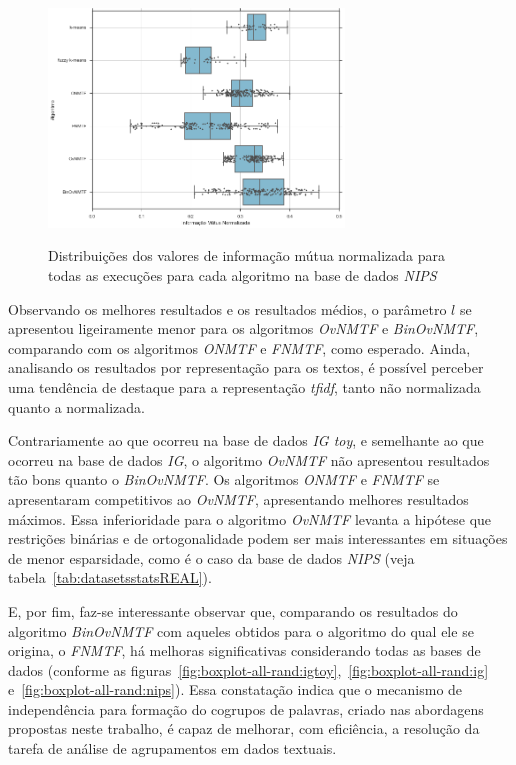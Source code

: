 \documentclass[
    12pt,                %
    oneside,            %
    a4paper,            %
    english,            %
    brazil                %
    ]{abntex2ppgsi}
\begin{document}
\begin{figure}[H]
    \centering
    \caption{Distribuições dos valores de informação mútua normalizada para todas as execuções para cada algoritmo na base de dados \textit{NIPS}}
    \includegraphics[width=0.7\textwidth]{img/boxplot-all-nmi-nips.png}
    \label{fig:boxplot-all-nmi:nips}
\end{figure}

Observando os melhores resultados e os resultados médios, o parâmetro $l$ se apresentou ligeiramente menor para os algoritmos \textit{OvNMTF} e \textit{BinOvNMTF}, comparando com os algoritmos \textit{ONMTF} e \textit{FNMTF}, como esperado. Ainda, analisando os resultados por representação para os textos, é possível perceber uma tendência de destaque para a representação \textit{tfidf}, tanto não normalizada quanto a normalizada.


Contrariamente ao que ocorreu na base de dados \textit{IG toy}, e semelhante ao que ocorreu na base de dados \textit{IG}, o algoritmo \textit{OvNMTF} não apresentou resultados tão bons quanto o \textit{BinOvNMTF}.
Os algoritmos \textit{ONMTF} e \textit{FNMTF} se apresentaram competitivos ao \textit{OvNMTF}, apresentando melhores resultados máximos.
Essa inferioridade para o algoritmo \textit{OvNMTF} levanta a hipótese que restrições binárias e de ortogonalidade podem ser mais interessantes em situações de menor esparsidade, como é o caso da base de dados \textit{NIPS} (veja tabela~\ref{tab:datasetsstatsREAL}).

E, por fim, faz-se interessante observar que, comparando os resultados do algoritmo \textit{BinOvNMTF} com aqueles obtidos para o algoritmo do qual ele se origina, o \textit{FNMTF}, há melhoras significativas considerando todas as bases de dados (conforme as figuras~\ref{fig:boxplot-all-rand:igtoy},~\ref{fig:boxplot-all-rand:ig} e~\ref{fig:boxplot-all-rand:nips}).
Essa constatação indica que o mecanismo de independência para formação do cogrupos de palavras, criado nas abordagens propostas neste trabalho, é capaz de melhorar, com eficiência, a resolução da tarefa de análise de agrupamentos em dados textuais.
\end{document}
